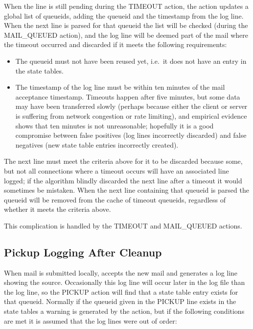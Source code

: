 When the  line is still pending during the TIMEOUT action,
the action updates a global list of queueids, adding the queueid and the
timestamp from the log line.  When the next  line is parsed
for that queueid the list will be checked (during the MAIL\_QUEUED action),
and the log line will be deemed part of the mail where the timeout occurred
and discarded if it meets the following requirements:

\begin{itemize}

    \item The queueid must not have been reused yet, i.e.\ it does not have
        an entry in the state tables.

    \item The timestamp of the  log line must be within ten
        minutes of the mail acceptance timestamp.  Timeouts happen after
        five minutes, but some data may have been transferred slowly
        (perhaps because either the client or server is suffering from
        network congestion or rate limiting), and empirical evidence shows
        that ten minutes is not unreasonable; hopefully it is a good
        compromise between false positives (log lines incorrectly
        discarded) and false negatives (new state table entries incorrectly
        created).

\end{itemize}

The next  line must meet the criteria above for it to be
discarded because some, but not all connections where a timeout occurs will
have an associated  line logged; if the algorithm blindly
discarded the next  line after a timeout it would sometimes
be mistaken.  When the next  line containing that queueid is
parsed the queueid will be removed from the cache of timeout queueids,
regardless of whether it meets the criteria above.

This complication is handled by the TIMEOUT and MAIL\_QUEUED actions.

\subsection{Pickup Logging After Cleanup}

\label{pickup logging after cleanup}

When mail is submitted locally,  accepts the new mail and
generates a log line showing the source.  Occasionally this log line will
occur later in the log file than the  log line, so the
PICKUP action will find that a state table entry exists for that queueid.
Normally if the queueid given in the PICKUP line exists in the state tables
a warning is generated by the  action, but if the following
conditions are met it is assumed that the log lines were out of order:

